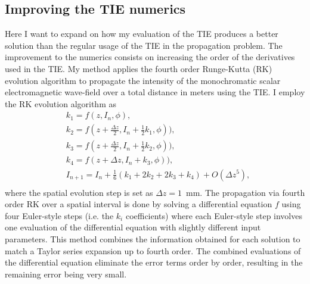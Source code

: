 \documentclass[10pt, a4paper, singlespacing]{report}
\begin{document}
\subsection{Improving the TIE numerics}\label{TI+RK}
Here I want to expand on how my evaluation of the TIE produces a better solution than the regular usage of the TIE in the propagation problem.
The improvement to the numerics consists on increasing the order of the derivatives used in the TIE. My method applies the fourth order Runge-Kutta (RK) evolution algorithm to propagate the intensity of the monochromatic scalar electromagnetic wave-field over a total distance in meters using the TIE. I employ the RK evolution algorithm as
\begin{equation} \label{eq:17}
\begin{split}
&k_1 = f(z, I_n, \phi),\\
&k_2 = f(z + \frac{\Delta z}{2}, I_n + \frac{1}{2}k_1, \phi)),\\
&k_3 = f(z + \frac{\Delta z}{2}, I_n + \frac{1}{2}k_2, \phi)),\\
&k_4 = f(z + \Delta z, I_n + k_3, \phi)),\\
&I_{n + 1} = I_{n} + \frac{1}{6}(k_1 + 2k_2 + 2k_3 + k_4) + O(\Delta z^5),\\
\end{split}
\end{equation}
where the spatial evolution step is set as $\Delta z = 1$~mm. The propagation via fourth order RK over a spatial interval is done by solving a differential equation $f$ using four Euler-style steps (i.e. the $k_i$ coefficients) where each Euler-style step involves one evaluation of the differential equation with slightly different input parameters. This method combines the information obtained for each solution to match a Taylor series expansion up to fourth order. The combined evaluations of the differential equation eliminate the error terms order by order, resulting in the remaining error being very small\cite{N_R}.


\end{document}
